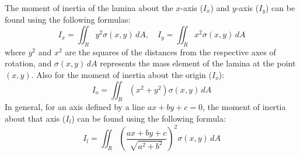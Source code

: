 \documentclass[11pt]{report}
\begin{document}
\begin{definition}
    The moment of inertia of the lamina about the $x$-axis ($I_x$) and $y$-axis ($I_y$) can be found using the following formulas:
    \begin{equation}
        I_x = \iint_R y^2 \sigma(x,y) \, dA, \quad I_y = \iint_R x^2 \sigma(x,y) \, dA
    \end{equation}
    where $y^2$ and $x^2$ are the squares of the distances from the respective axes of rotation, and $\sigma(x,y) \, dA$ represents the mass element of the lamina at the point $(x,y)$. Also for the moment of inertia about the origin ($I_o$):
    \begin{equation}
        I_o = \iint_R (x^2 + y^2) \sigma(x,y) \, dA
    \end{equation}
    In general, for an axis defined by a line $ax + by + c = 0$, the moment of inertia about that axis ($I_l$) can be found using the following formula:
    \begin{equation}
        I_l = \iint_R \left( \frac{ax + by + c}{\sqrt{a^2 + b^2}} \right)^2 \sigma(x,y) \, dA
    \end{equation}
\end{definition}
\end{document}
